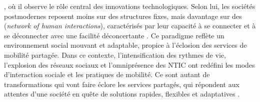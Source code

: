\begin{refsegment}
{}, où il observe le rôle central des innovations technologiques. Selon lui, les sociétés postmodernes reposent moins sur des structures fixes, mais davantage sur des  (\textsl{network of human interactions}), caractérisés par leur capacité à se connecter et à se déconnecter avec une facilité déconcertante \textcolor{blue}{\autocite{philosophie_science_et_societe_modernite_2017}}. Ce paradigme reflète un environnement social mouvant et adaptable, propice à l’éclosion des services de mobilité partagée. Dans ce contexte, l’intensification des rythmes de vie, l’explosion des réseaux sociaux et l’omniprésence des \acrshort{NTIC} ont redéfini les modes d’interaction sociale et les pratiques de mobilité. Ce sont autant de transformations qui vont faire éclore les services partagés, qui répondent aux attentes d’une société en quête de solutions rapides, flexibles et adaptatives \textcolor{blue}{\autocite[44]{mathew_analysis_2019}}.%


\end{refsegment}

